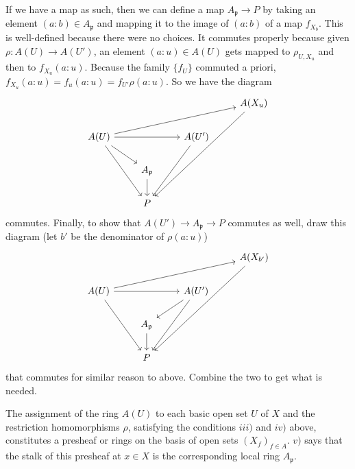 \begin{questions}
\begin{enumerate}
\begin{solution}
	If we have a map as such, then we can define a map $A_{\mathfrak{p}} \to P $ by taking an element $(a:b) \in A_{\mathfrak{p}} $ and mapping it to the image of $(a:b) $ of a map $f_{X_b} $.
	This is well-defined because there were no choices.
	It commutes properly because given $\rho: A(U) \to A(U') $, an element $(a:u) \in A(U) $ gets mapped to $\rho_{U, X_u}$ and then to $f_{X_u}(a:u) $.
	Because the family $\{f_U\}   $ commuted a priori, $f_{X_u}(a:u) = f_u(a:u) = f_{U'}\rho(a:u)$.
	So we have the diagram
	\[
		\begin{tikzcd}
			& & &A(X_u)\\
			A(U) & & A(U')&\\
			     & A_{\mathfrak{p}} &&\\
			     &P&&
		\arrow[from=2-1,to=1-4]
		\arrow[from=2-1,to=2-3]
		\arrow[from=2-1,to=3-2]
		\arrow[from=2-1,to=4-2]
		\arrow[from=1-4,to=4-2]
		\arrow[from=3-2,to=4-2]
		\arrow[from=2-3,to=4-2]
		\end{tikzcd}
	\] 
	commutes.
	Finally, to show that $A(U') \to A_{\mathfrak{p}} \to P $ commutes as well, draw this diagram (let $b' $ be the denominator of $\rho(a:u) $)
	\[
		\begin{tikzcd}
			& & &A(X_{b'})\\
			A(U) & & A(U')&\\
			     & A_{\mathfrak{p}} &&\\
			     &P&&
		\arrow[from=2-1,to=1-4]
		\arrow[from=2-1,to=2-3]
		\arrow[from=2-1,to=4-2]
		\arrow[from=1-4,to=4-2]
		\arrow[from=3-2,to=4-2]
		\arrow[from=2-3,to=4-2]
		\arrow[from=2-3,to=3-2]
		\end{tikzcd}
	\] 
	that commutes for similar reason to above.
	Combine the two to get what is needed.
\end{solution}
The assignment of the ring $A(U) $ to each basic open set $U $ of $X $ and the restriction homomorphisms $\rho $, satisfying the conditions $iii) $ and $iv) $ above, constitutes a presheaf or rings on the basis of open sets $(X_f)_{f\in A} $. $v) $ says that the stalk of this presheaf at $x\in X $ is the corresponding local ring $A_{\mathfrak{p}} $.
\end{enumerate}


\end{questions}
